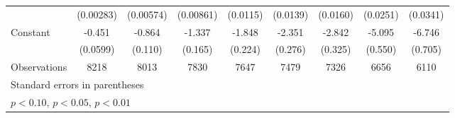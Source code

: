 \begin{table}[htbp]
\begin{tabular}{l*{8}{c}}
                    &   (0.00283)         &   (0.00574)         &   (0.00861)         &    (0.0115)         &    (0.0139)         &    (0.0160)         &    (0.0251)         &    (0.0341)         \\
[1em]
Constant            &      -0.451\sym{***}&      -0.864\sym{***}&      -1.337\sym{***}&      -1.848\sym{***}&      -2.351\sym{***}&      -2.842\sym{***}&      -5.095\sym{***}&      -6.746\sym{***}\\
                    &    (0.0599)         &     (0.110)         &     (0.165)         &     (0.224)         &     (0.276)         &     (0.325)         &     (0.550)         &     (0.705)         \\
\hline
Observations        &        8218         &        8013         &        7830         &        7647         &        7479         &        7326         &        6656         &        6110         \\
\hline\hline
\multicolumn{9}{l}{\footnotesize Standard errors in parentheses}\\
\multicolumn{9}{l}{\footnotesize \sym{*} \(p<0.10\), \sym{**} \(p<0.05\), \sym{***} \(p<0.01\)}\\
\end{tabular}
\end{table}
